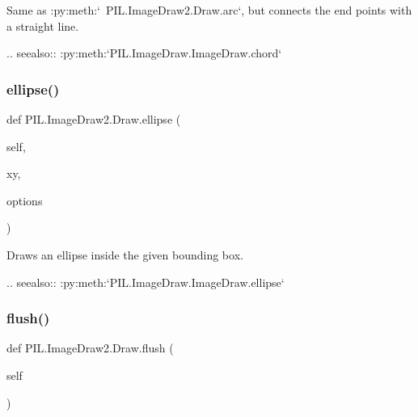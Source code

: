 \begin{DoxyVerb}Same as :py:meth:`~PIL.ImageDraw2.Draw.arc`, but connects the end points
with a straight line.

.. seealso:: :py:meth:`PIL.ImageDraw.ImageDraw.chord`
\end{DoxyVerb}
 \mbox{\label{classPIL_1_1ImageDraw2_1_1Draw_a1831fa5e00aba64850e37634c1033f4e}} 
\subsubsection{\texorpdfstring{ellipse()}{ellipse()}}
{\footnotesize\ttfamily def P\+I\+L.\+Image\+Draw2.\+Draw.\+ellipse (\begin{DoxyParamCaption}\item[{}]{self,  }\item[{}]{xy,  }\item[{}]{options }\end{DoxyParamCaption})}

\begin{DoxyVerb}Draws an ellipse inside the given bounding box.

.. seealso:: :py:meth:`PIL.ImageDraw.ImageDraw.ellipse`
\end{DoxyVerb}
 \mbox{\label{classPIL_1_1ImageDraw2_1_1Draw_a6473f1f92729fbd29c4193e3c3f3e2af}} 
\subsubsection{\texorpdfstring{flush()}{flush()}}
{\footnotesize\ttfamily def P\+I\+L.\+Image\+Draw2.\+Draw.\+flush (\begin{DoxyParamCaption}\item[{}]{self }\end{DoxyParamCaption})}

\mbox{\label{classPIL_1_1ImageDraw2_1_1Draw_a80cc6dd96f10150df186a304b01acf30}} 
